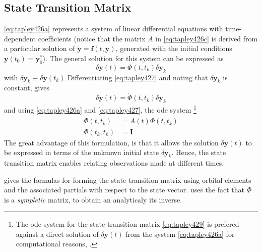 \subsection{State Transition Matrix}\label{ssec:pod-state-transition-matrix}

\autoref{eq:tapley426a} represents a system of linear differential equations with 
time-dependent coefficients (notice that the matrix $A$ in \autoref{eq:tapley426c} 
is derived from a particular solution of $\dot{\bm{y}}=\bm{f}(t,\bm{y})$, generated 
with the initial conditions $\bm{y}(t_0)=\bm{y}^{*}_{0}$). The general solution for 
this system can be expressed as 
\begin{equation}\label{eq:tapley427}
    \delta \bm{y}(t) = \Phi (t,t_k) \delta \bm{y}_k
\end{equation}
with $\delta \bm{y}_k \equiv \delta \bm{y}(t_k)$
Differentiating \autoref{eq:tapley427} and noting that $\delta \bm{y}_k$ is constant, 
gives
\begin{equation}\label{eq:tapley429}
    \delta \dot{\bm{y}}(t) = \dot{\Phi} (t,t_k) \delta \bm{y}_k
\end{equation}
and using \autoref{eq:tapley426a} and \autoref{eq:tapley427}, the \gls{ode} system 
\footnote{
    The \gls{ode} system for the state transition matrix \autoref{eq:tapley429} 
    is prefered against a direct solution of $\delta \bm{y}(t)$ from the system
    \autoref{eq:tapley426a} for computational reasons, \cite{Tapley2004}.
}
\begin{equation}\label{eq:tapley4210}
    \begin{aligned}
        \dot{\Phi} (t,t_k) &= A(t) \Phi (t,t_k) \\
        \Phi (t_k,t_k) &= \bm{I}
    \end{aligned}
\end{equation}
The great advantage of this formulation, is that it allows the solution $\delta \bm{y}(t)$ 
to be expressed in terms of the unknown initial state $\delta \bm{y}_k$. Hence, the 
state transition matrix enables relating observations made at different times.

\cite{Montenbruck2000} gives the formulas for forming the state transition matrix 
using orbital elements and the associated partials with respect to the state vector.
\cite{Battin1999} uses the fact that $\Phi$ is a \emph{sympletic} matrix, to obtain 
an analyticaly its inverse.

